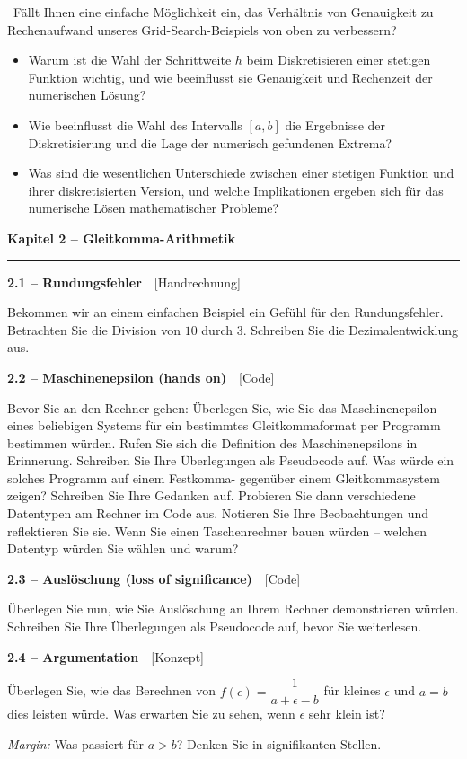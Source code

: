 \documentclass[a4paper,10pt]{article}
\newcommand{\kapitel}[1]{%
  \par\vspace{7pt}
  {\large\bfseries\color{accent} #1}\par
  \noindent\textcolor{accent}{\rule{\linewidth}{0.8pt}}\par\vspace{2pt}}
\newcommand{\aufg}[2]{%
  \par\vspace{3pt}
  {\bfseries\color{accent2} #1}~~{\footnotesize\color{accent2}[#2]}\par\vspace{1pt}}
\newcommand{\teaser}[1]{%
  \par\vspace{2pt}{\color{accent4}\textbf{Denkanstoß.}}~#1\par}
\newcommand{\reflexion}{%
  \par\vspace{2pt}{\bfseries\color{accent3} Selbstreflexionsfragen}\par\vspace{1pt}}
\begin{document}
\teaser{Fällt Ihnen eine einfache Möglichkeit ein, das Verhältnis von Genauigkeit
zu Rechenaufwand unseres Grid-Search-Beispiels von oben zu verbessern?}

\reflexion
\begin{itemize}
  \item Warum ist die Wahl der Schrittweite $h$ beim Diskretisieren einer stetigen
        Funktion wichtig, und wie beeinflusst sie Genauigkeit und Rechenzeit der
        numerischen Lösung?
  \item Wie beeinflusst die Wahl des Intervalls $[a,b]$ die Ergebnisse der
        Diskretisierung und die Lage der numerisch gefundenen Extrema?
  \item Was sind die wesentlichen Unterschiede zwischen einer stetigen Funktion und
        ihrer diskretisierten Version, und welche Implikationen ergeben sich für das
        numerische Lösen mathematischer Probleme?
\end{itemize}

\kapitel{Kapitel 2 \;--\; Gleitkomma-Arithmetik}

\aufg{2.1 \;--\; Rundungsfehler}{Handrechnung}
Bekommen wir an einem einfachen Beispiel ein Gefühl für den Rundungsfehler.
Betrachten Sie die Division von $10$ durch $3$. Schreiben Sie die Dezimalentwicklung
aus.

\aufg{2.2 \;--\; Maschinenepsilon (hands on)}{Code}
Bevor Sie an den Rechner gehen: Überlegen Sie, wie Sie das Maschinenepsilon eines
beliebigen Systems für ein bestimmtes Gleitkommaformat per Programm bestimmen
würden. Rufen Sie sich die Definition des Maschinenepsilons in Erinnerung. Schreiben
Sie Ihre Überlegungen als Pseudocode auf. Was würde ein solches Programm auf einem
Festkomma- gegenüber einem Gleitkommasystem zeigen? Schreiben Sie Ihre Gedanken auf.
Probieren Sie dann verschiedene Datentypen am Rechner im Code aus. Notieren Sie Ihre
Beobachtungen und reflektieren Sie sie. Wenn Sie einen Taschenrechner bauen würden --
welchen Datentyp würden Sie wählen und warum?

\aufg{2.3 \;--\; Auslöschung (loss of significance)}{Code}
Überlegen Sie nun, wie Sie Auslöschung an Ihrem Rechner demonstrieren würden.
Schreiben Sie Ihre Überlegungen als Pseudocode auf, bevor Sie weiterlesen.

\aufg{2.4 \;--\; Argumentation}{Konzept}
Überlegen Sie, wie das Berechnen von $f(\epsilon)=\dfrac{1}{a+\epsilon-b}$ für
kleines $\epsilon$ und $a=b$ dies leisten würde. Was erwarten Sie zu sehen, wenn
$\epsilon$ sehr klein ist?
\par\textit{Margin:} Was passiert für $a>b$? Denken Sie in signifikanten Stellen.
\end{document}
